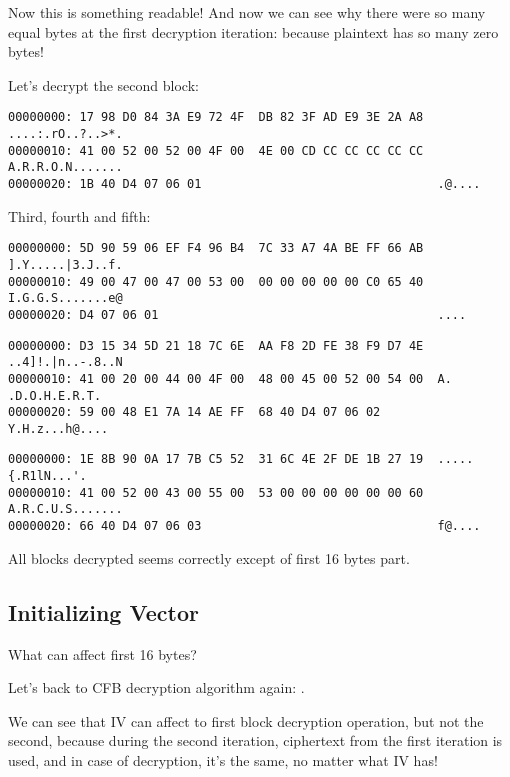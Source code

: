Now this is something readable!
And now we can see why there were so many equal bytes at the first decryption iteration:
because plaintext has so many zero bytes!

Let's decrypt the second block:

\begin{lstlisting}
00000000: 17 98 D0 84 3A E9 72 4F  DB 82 3F AD E9 3E 2A A8  ....:.rO..?..>*.
00000010: 41 00 52 00 52 00 4F 00  4E 00 CD CC CC CC CC CC  A.R.R.O.N.......
00000020: 1B 40 D4 07 06 01                                 .@....
\end{lstlisting}

Third, fourth and fifth:

\begin{lstlisting}
00000000: 5D 90 59 06 EF F4 96 B4  7C 33 A7 4A BE FF 66 AB  ].Y.....|3.J..f.
00000010: 49 00 47 00 47 00 53 00  00 00 00 00 00 C0 65 40  I.G.G.S.......e@
00000020: D4 07 06 01                                       ....
\end{lstlisting}

\begin{lstlisting}
00000000: D3 15 34 5D 21 18 7C 6E  AA F8 2D FE 38 F9 D7 4E  ..4]!.|n..-.8..N
00000010: 41 00 20 00 44 00 4F 00  48 00 45 00 52 00 54 00  A. .D.O.H.E.R.T.
00000020: 59 00 48 E1 7A 14 AE FF  68 40 D4 07 06 02        Y.H.z...h@....
\end{lstlisting}

\begin{lstlisting}
00000000: 1E 8B 90 0A 17 7B C5 52  31 6C 4E 2F DE 1B 27 19  .....{.R1lN...'.
00000010: 41 00 52 00 43 00 55 00  53 00 00 00 00 00 00 60  A.R.C.U.S.......
00000020: 66 40 D4 07 06 03                                 f@....
\end{lstlisting}

All blocks decrypted seems correctly except of first 16 bytes part.

\subsection{Initializing Vector}

What can affect first 16 bytes?

Let's back to \ac{CFB} decryption algorithm again: .

We can see that \ac{IV} can affect to first block decryption operation, but not the second,
because during the second iteration, ciphertext from the first iteration is used, and in case of decryption,
it's the same, no matter what \ac{IV} has!

